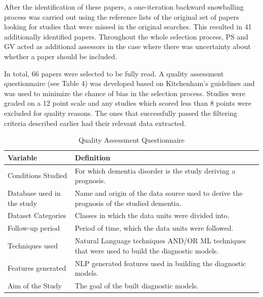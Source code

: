 After the identification of these papers, a one-iteration backward snowballing process was carried out using the reference lists of the original set of papers looking for studies that were missed in the original searches. This resulted in 41 additionally identified papers. Throughout the whole selection process, PS and GV acted as additional assessors in the case where there was uncertainty about whether a paper should be included.
\par 
In total, 66 papers were selected to be fully read. A quality assessment questionnaire (see Table 4) was developed based on Kitchenham's guidelines and was used to minimize the chance of bias in the selection process. Studies were graded on a 12 point scale and any studies which scored less than 8 points were excluded for quality reasons. The ones that successfully passed the filtering criteria described earlier had their relevant data extracted. 

\begin{table}[H]
	\begin{center}
	\begin{tabular}{ | p{6cm} | p{6cm} | }
	\hline
	Variable & Definition \\ \hline
	Conditions Studied & For which dementia disorder is the study deriving a prognosis. \\ \hline
	Database used in the study & Name and origin of the data source used to derive the prognosis of the studied dementia. \\ \hline
	Dataset Categories & Classes in which the data units were divided into. \\ \hline
	Follow-up period & Period of time, which the data units were followed. \\ \hline
	Techniques used & Natural Language techniques AND/OR ML techniques that were used to build the diagnostic models. \\ \hline 
	Features generated & NLP generated features used in building the diagnostic models. \\ \hline
	Aim of the Study & The goal of the built diagnostic models. \\
	\hline 
	\end{tabular}
	\caption[Table caption text]{Quality Assessment Questionnaire}
	\label{table:name}
	\end{center}
\end{table}

